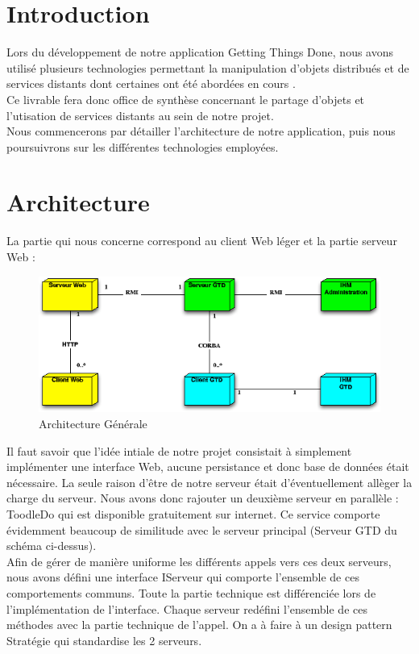 \chapter{Introduction}
Lors du développement de notre application Getting Things Done, nous avons utilisé plusieurs technologies permettant la manipulation d'objets distribués et de services distants dont certaines ont été abordées en cours .\\
Ce livrable fera donc office de synthèse concernant le partage d'objets et l'utisation de services distants au sein de notre projet.\\
Nous commencerons par détailler l'architecture de notre application, puis nous poursuivrons sur les différentes technologies employées.


\chapter{Architecture}
La partie qui nous concerne correspond au client Web léger et la partie serveur Web : \\

\begin{figure}[H]
\begin{center}
\includegraphics[scale=0.8]{archi.png}
\caption{Architecture Générale}
\end{center}
\end{figure}


Il faut savoir que l'idée intiale de notre projet consistait à simplement implémenter une interface Web, aucune persistance et donc base de données était nécessaire. La seule raison d'être de notre serveur était d'éventuellement allèger la charge du serveur. Nous avons donc rajouter un deuxième serveur en parallèle : ToodleDo qui est disponible gratuitement sur internet.
Ce service comporte évidemment beaucoup de similitude avec le serveur principal (Serveur GTD du schéma ci-dessus).
\\
Afin de gérer de manière uniforme les différents appels vers ces deux serveurs, nous avons défini une interface IServeur qui comporte l'ensemble de ces comportements communs. Toute la partie technique est différenciée lors de l'implémentation de l'interface. Chaque serveur redéfini l'ensemble de ces méthodes avec la partie technique de l'appel. On a à faire à un design pattern Stratégie qui standardise les 2 serveurs.
\\

